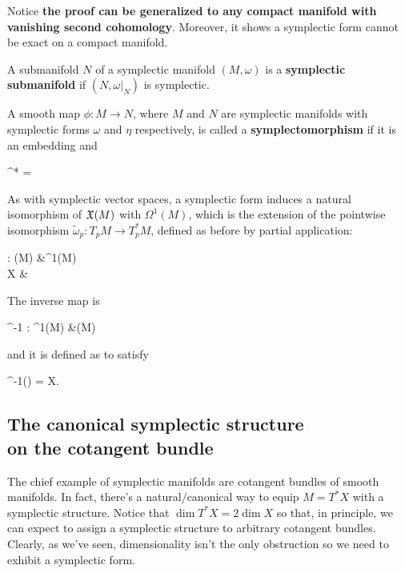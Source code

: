 \documentclass[main.tex]{subfiles}
\begin{document}
\begin{remark}
	Notice \textbf{the proof can be generalized to any compact manifold with vanishing second cohomology}. Moreover, it shows a symplectic form cannot be exact on a compact manifold.
\end{remark}

\begin{definition}
	A submanifold $N$ of a symplectic manifold $(M, \omega)$ is a \textbf{symplectic submanifold} if $(N, \omega\vert_N)$ is symplectic.
\end{definition}
\begin{definition}
	A smooth map $\phi : M \to N$, where $M$ and $N$ are symplectic manifolds with symplectic forms $\omega$ and $\eta$ respectively, is called a \textbf{symplectomorphism} if it is an embedding and
	\begin{eqalign}
		\phi^* \eta = \omega
	\end{eqalign}
\end{definition}

\begin{remark}
\label{rmk:inverse_ipr}
	As with symplectic vector spaces, a symplectic form induces a natural isomorphism of $\mathfrak{X}(M)$ with $\Omega^1(M)$, which is the extension of the pointwise isomorphism $\tilde\omega_p : T_pM \to T^*_pM$, defined as before by partial application:
	\begin{eqalign}
		\omega : \fields(M) &\longto \Omega^1(M)\\
				X &\longmapsto \ipr{X}\omega
	\end{eqalign}
	The inverse map is
	\begin{eqalign}
		\omega^{-1} : \Omega^1(M) &\longto \fields(M)
	\end{eqalign}
	and it is defined as to satisfy
	\begin{eqalign}
		\omega^{-1}(\omega) = X.
	\end{eqalign}
\end{remark}

\subsection[The canonical symplectic structure on the cotangent bundle]{The canonical symplectic structure\\on the cotangent bundle}
The chief example of symplectic manifolds are cotangent bundles of smooth manifolds. In fact, there's a natural/canonical way to equip $M= T^*X$ with a symplectic structure. Notice that $\dim T^*X = 2\dim X$ so that, in principle, we can expect to assign a symplectic structure to arbitrary cotangent bundles. Clearly, as we've seen, dimensionality isn't the only obstruction so we need to exhibit a symplectic form.
\end{document}
